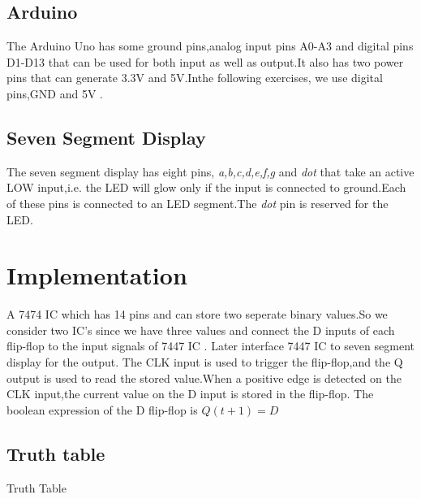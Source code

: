 \documentclass[10pt,a4paper]{article}
\begin{document}
\subsection{Arduino} 
The Arduino Uno has some ground pins,analog input pins A0-A3 and digital pins D1-D13 that can be used for both input as well as output.It also has two power pins that can generate 3.3V and 5V.Inthe following exercises, we use digital pins,GND and 5V .
\subsection{Seven Segment Display}
The seven segment display has eight pins, \emph{a,b,c,d,e,f,g} and \emph{dot} that take an active LOW input,i.e. the LED will glow only if the input is connected to ground.Each of these pins is connected to an LED segment.The \emph{dot} pin is reserved for the LED.
\section{Implementation}
A 7474 IC which  has 14 pins and can store two seperate binary values.So we consider two IC's since we have three values  and connect the  D inputs of each flip-flop to the input signals of 7447 IC . Later interface 7447 IC to seven segment display for the output. The CLK input is used to trigger the flip-flop,and the Q output is used to read the stored value.When a positive edge is detected on the CLK input,the current value on the D input is stored in the flip-flop. The boolean expression of the D flip-flop is $Q(t+1) = D$
\subsection{Truth table}
\begin{table}[!h]
\centering
   
\caption{Truth Table}
\label{table:truth_table}
\end{table}
\end{document}
